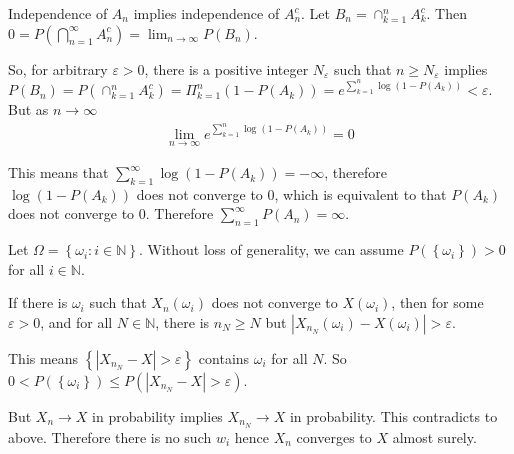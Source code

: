 \begin{problem}[2.3.8] \hfill

	Independence of $A_n$ implies independence of $A_n ^c$. Let $B_n = \cap_{k=1}^n A_k^c$. Then $0 = P\left( \bigcap_{n=1}^\infty A_n^c \right) = \lim_{n\rightarrow \infty} P(B_n)$.

	So, for arbitrary $\varepsilon >0$, there is a positive integer $N_\varepsilon$ such that $n \geq N_\varepsilon$ implies $P(B_n) = P\left( \cap_{k=1}^n A_k^c\right) = \Pi_{k=1}^n \left( 1-P(A_k) \right) = e^{\sum_{k=1}^n \log \left( 1-P(A_k) \right)} < \varepsilon$.
	But as $n\rightarrow \infty$
	\begin{equation*}
		\begin{split}
			\lim_{n\rightarrow \infty} e^{\sum_{k=1}^n \log \left( 1-P(A_k) \right)} =0
		\end{split}
		\label{<+label+>}
	\end{equation*}

	This means that $\sum_{k=1}^\infty \log \left( 1-P(A_k) \right) = -\infty$, therefore $\log \left( 1-P(A_k) \right)$ does not converge to $0$, which is equivalent to that $P(A_k)$ does not converge to $0$. Therefore $\sum_{n=1}^{\infty} P(A_n) = \infty$.
	
\end{problem}


\begin{problem}[2.3.12] \hfill

Let $\Omega = \left\{ \omega_i : i \in \mathbb{N} \right\}$. Without loss of generality, we can assume $P(\left\{ \omega_i \right\}) >0$ for all $i \in \mathbb{N}$.

If there is $\omega_i$ such that $X_n(\omega_i)$ does not converge to $X(\omega_i)$, then for some $\varepsilon >0$, and for all $N \in \mathbb{N}$, there is $n_N \geq N$ but $\left | X_{n_N}(\omega_i) - X(\omega_i) \right | > \varepsilon$.

This means $\left\{ |X_{n_N}-X| > \varepsilon \right\}$ contains $\omega_i$ for all $N$. So $0 < P(\left\{ \omega_i \right\}) \leq P\left( |X_{n_N}-X| > \varepsilon \right)$.

But $X_n \rightarrow X$ in probability implies $X_{n_N} \rightarrow X$ in probability. This contradicts to above.
Therefore there is no such $w_i$ hence $X_n$ converges to $X$ almost surely.
	
\end{problem}
